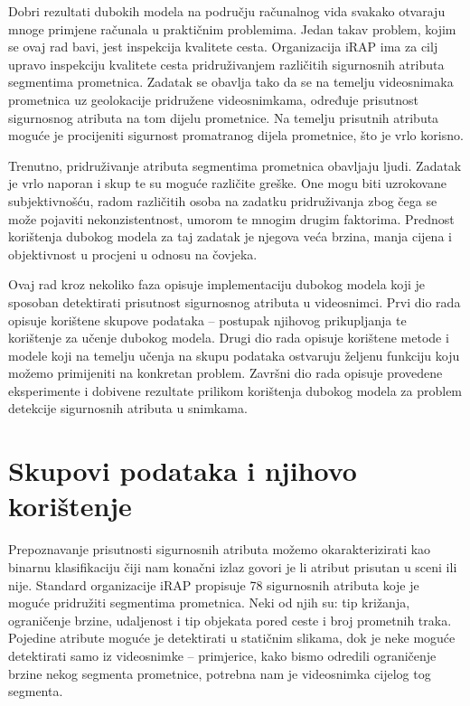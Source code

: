 \documentclass[times, utf8, diplomski, numeric]{fer}
\begin{document}
Dobri rezultati dubokih modela na području računalnog vida svakako otvaraju mnoge primjene računala u praktičnim problemima. 
Jedan takav problem, kojim se ovaj rad bavi, jest inspekcija kvalitete cesta. 
Organizacija iRAP  ima za cilj upravo inspekciju kvalitete cesta pridruživanjem različitih sigurnosnih atributa segmentima prometnica.
Zadatak se obavlja tako da se na temelju videosnimaka prometnica uz geolokacije pridružene videosnimkama, određuje prisutnost sigurnosnog atributa na tom dijelu prometnice.
Na temelju prisutnih atributa moguće je procijeniti sigurnost promatranog dijela prometnice, što je vrlo korisno.

Trenutno, pridruživanje atributa segmentima prometnica obavljaju ljudi. 
Zadatak je vrlo naporan i skup te su moguće različite greške. One mogu biti uzrokovane subjektivnošću, radom različitih osoba na zadatku pridruživanja zbog čega se može pojaviti nekonzistentnost, umorom te mnogim drugim faktorima.
Prednost korištenja dubokog modela za taj zadatak je njegova veća brzina, manja cijena i objektivnost u procjeni u odnosu na čovjeka.

Ovaj rad kroz nekoliko faza opisuje implementaciju dubokog modela koji je sposoban detektirati prisutnost sigurnosnog atributa u videosnimci.
Prvi dio rada opisuje korištene skupove podataka -- postupak njihovog prikupljanja te korištenje za učenje dubokog modela.
Drugi dio rada opisuje korištene metode i modele koji na temelju učenja na skupu podataka ostvaruju željenu funkciju koju možemo primijeniti na konkretan problem.
Završni dio rada opisuje provedene eksperimente i dobivene rezultate prilikom korištenja dubokog modela za problem detekcije sigurnosnih atributa u snimkama.


\chapter{Skupovi podataka i njihovo korištenje} \label{chapter:skupovi_podataka}
 
Prepoznavanje prisutnosti sigurnosnih atributa možemo okarakterizirati kao binarnu klasifikaciju čiji nam konačni izlaz govori je li atribut prisutan u sceni ili nije.
Standard organizacije iRAP propisuje 78 sigurnosnih atributa \citep{man:ftts_irap_attributes} koje je moguće pridružiti segmentima prometnica.
Neki od njih su: tip križanja, ograničenje brzine, udaljenost i tip objekata pored ceste i broj prometnih traka.
Pojedine atribute moguće je detektirati u statičnim slikama, dok je neke moguće detektirati samo iz videosnimke -- primjerice, kako bismo odredili ograničenje brzine nekog segmenta prometnice, potrebna nam je videosnimka cijelog tog segmenta.
\end{document}
